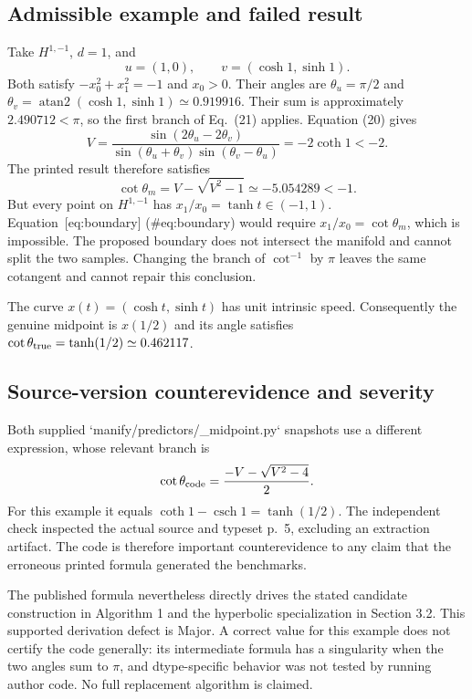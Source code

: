 \documentclass[10pt]{article}
\begin{document}
\subsection*{Admissible example and failed result}
Take \(H^{1,-1}\), \(d=1\), and \[u=(1,0),\qquad v=(\cosh1,\sinh1).\] Both satisfy \(-x_0^2+x_1^2=-1\) and \(x_0>0\). Their angles are \(\theta_u=\pi/2\) and \(\theta_v=\operatorname{atan2}(\cosh1,\sinh1)\simeq0.919916\). Their sum is approximately \(2.490712<\pi\), so the first branch of Eq. (21) applies. Equation (20) gives \[V=\frac{\sin(2\theta_u-2\theta_v)}
        {\sin(\theta_u+\theta_v)\sin(\theta_v-\theta_u)}
  =-2\coth1<-2.\] The printed result therefore satisfies \[\cot\theta_m=V-\sqrt{V^2-1}\simeq-5.054289<-1.\] But every point on \(H^{1,-1}\) has \(x_1/x_0=\tanh t\in(-1,1)\). Equation [eq:boundary] (\#eq:boundary) would require \(x_1/x_0=\cot\theta_m\), which is impossible. The proposed boundary does not intersect the manifold and cannot split the two samples. Changing the branch of \(\cot^{-1}\) by \(\pi\) leaves the same cotangent and cannot repair this conclusion.\par
The curve \(x(t)=(\cosh t,\sinh t)\) has unit intrinsic speed. Consequently the genuine midpoint is \(x(1/2)\) and its angle satisfies \(\cot\theta_{\rm true}=\tanh(1/2)\simeq0.462117\).\par
\subsection*{Source-version counterevidence and severity}
Both supplied `manify/predictors/\_midpoint.py` snapshots use a different expression, whose relevant branch is \[\cot\theta_{\rm code}=\frac{-V-\sqrt{V^2-4}}{2}.\] For this example it equals \(\coth1-\operatorname{csch}1=\tanh(1/2)\). The independent check inspected the actual source and typeset p. 5, excluding an extraction artifact. The code is therefore important counterevidence to any claim that the erroneous printed formula generated the benchmarks.\par
The published formula nevertheless directly drives the stated candidate construction in Algorithm 1 and the hyperbolic specialization in Section 3.2. This supported derivation defect is Major. A correct value for this example does not certify the code generally: its intermediate formula has a singularity when the two angles sum to \(\pi\), and dtype-specific behavior was not tested by running author code. No full replacement algorithm is claimed.\par
\end{document}
